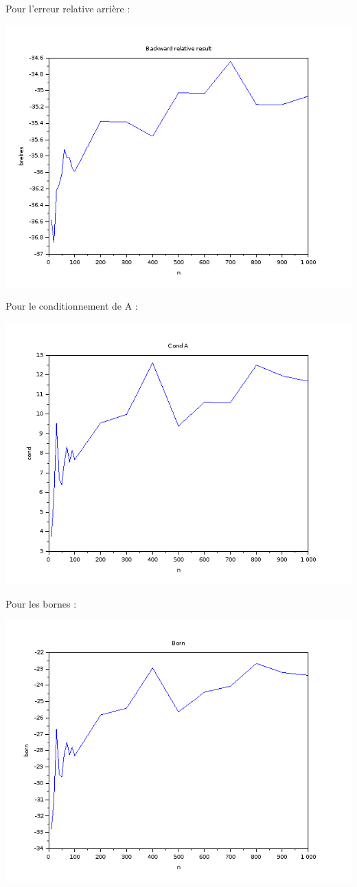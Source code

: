 \documentclass{article}
\begin{document}
Pour l'erreur relative arrière :

\includegraphics[scale=0.5]{img/brelres.png}

Pour le conditionnement de A :

\includegraphics[scale=0.5]{img/capa.png}

Pour les bornes :

\includegraphics[scale=0.5]{img/born.png}
\end{document}
